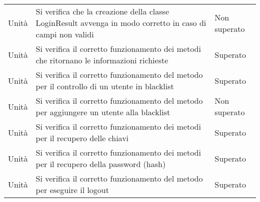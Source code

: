 \begin{center}
\begin{xltabular}{\linewidth}{|l|X|l|}
        Unità & Si verifica che la creazione della classe LoginResult avvenga in modo corretto in caso di campi non validi & Non superato\\
        Unità & Si verifica il corretto funzionamento dei metodi che ritornano le informazioni richieste & Superato\\
        Unità & Si verifica il corretto funzionamento del metodo per il controllo di un utente in blacklist & Superato\\
        Unità & Si verifica il corretto funzionamento del metodo per aggiungere un utente alla blacklist & Non superato\\
        Unità & Si verifica il corretto funzionamento dei metodi per il recupero delle chiavi & Superato\\
        Unità & Si verifica il corretto funzionamento dei metodi per il recupero della password (hash) & Superato\\
        Unità & Si verifica il corretto funzionamento del metodo per eseguire il logout & Superato\\


\end{xltabular}
\end{center}
